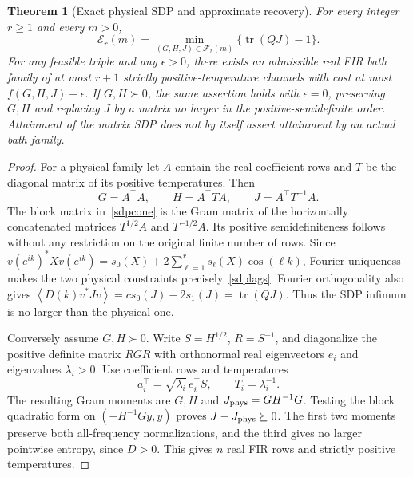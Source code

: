 \documentclass[11pt]{article}
\newtheorem{theorem}{Theorem}
\newcommand{\avg}[1]{\left\langle #1\right\rangle}
\begin{document}
\begin{theorem}[Exact physical SDP and approximate recovery]\label{exactsdp}
For every integer $r\ge1$ and every $m>0$,
\begin{equation}\label{sdpminimum}
\mathcal E_r(m)=\min_{(G,H,J)\in\mathcal F_r(m)}\{\operatorname{tr}(QJ)-1\}.
\end{equation}
For any feasible triple and any $\epsilon>0$, there exists an admissible real FIR bath family of at most $r+1$ strictly positive-temperature channels with cost at most $f(G,H,J)+\epsilon$. If $G,H\succ0$, the same assertion holds with $\epsilon=0$, preserving $G,H$ and replacing $J$ by a matrix no larger in the positive-semidefinite order. Attainment of the matrix SDP does not by itself assert attainment by an actual bath family.
\end{theorem}
\begin{proof}
For a physical family let $A$ contain the real coefficient rows and $T$ be the diagonal matrix of its positive temperatures. Then
\[
 G=A^\top A,\qquad H=A^\top TA,\qquad J=A^\top T^{-1}A.
\]
The block matrix in~\eqref{sdpcone} is the Gram matrix of the horizontally concatenated matrices $T^{1/2}A$ and $T^{-1/2}A$. Its positive semidefiniteness follows without any restriction on the original finite number of rows. Since $v(e^{ik})^*Xv(e^{ik})=s_0(X)+2\sum_{\ell=1}^rs_\ell(X)\cos(\ell k)$, Fourier uniqueness makes the two physical constraints precisely~\eqref{sdplags}. Fourier orthogonality also gives $\avg{D(k)v^*Jv}=cs_0(J)-2s_1(J)=\operatorname{tr}(QJ)$. Thus the SDP infimum is no larger than the physical one.

Conversely assume $G,H\succ0$. Write $S=H^{1/2}$, $R=S^{-1}$, and diagonalize the positive definite matrix $RGR$ with orthonormal real eigenvectors $e_i$ and eigenvalues $\lambda_i>0$. Use coefficient rows and temperatures
\begin{equation}\label{sdp-recover}
 a_i^\top=\sqrt{\lambda_i}\,e_i^\top S,\qquad T_i=\lambda_i^{-1}.
\end{equation}
The resulting Gram moments are $G,H$ and $J_{\rm phys}=GH^{-1}G$. Testing the block quadratic form on $(-H^{-1}Gy,y)$ proves $J-J_{\rm phys}\succeq0$. The first two moments preserve both all-frequency normalizations, and the third gives no larger pointwise entropy, since $D>0$. This gives $n$ real FIR rows and strictly positive temperatures.


\end{proof}
\end{document}
